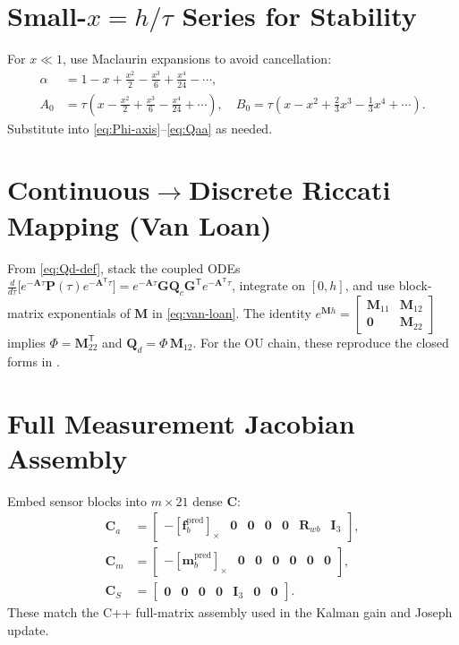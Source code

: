 \documentclass[11pt]{article}
\newcommand{\vect}[1]{\bm{#1}}
\newcommand{\mat}[1]{\bm{#1}}
\newcommand{\T}{\mathsf{T}}
\newcommand{\I}{\mat{I}}
\newcommand{\skx}[1]{\left[ #1 \right]_\times}
\begin{document}
\section{Small-\texorpdfstring{$x=h/\tau$}{x} Series for Stability}
\label{app:series-guards}
For \(x\ll 1\), use Maclaurin expansions to avoid cancellation:
\begin{align}
  \alpha &= 1 - x + \tfrac{x^2}{2} - \tfrac{x^3}{6} + \tfrac{x^4}{24} - \cdots, \\
  A_0 &= \tau\!\left(x - \tfrac{x^2}{2} + \tfrac{x^3}{6} - \tfrac{x^4}{24} + \cdots\right),\quad
  B_0 = \tau\!\left(x - x^2 + \tfrac{2}{3}x^3 - \tfrac{1}{3}x^4 + \cdots\right).
  \label{eq:series}
\end{align}
Substitute into \eqref{eq:Phi-axis}--\eqref{eq:Qaa} as needed.

\section{Continuous\texorpdfstring{$\to$}{}Discrete Riccati Mapping (Van Loan)}
\label{app:van-loan-derivation}
From \eqref{eq:Qd-def}, stack the coupled ODEs
\(
\frac{d}{d\tau}\bigl[e^{-\mat{A}\tau}\mat{P}(\tau)e^{-\mat{A}^{\T}\tau}\bigr]
= e^{-\mat{A}\tau}\mat{G}\mat{Q}_c\mat{G}^{\T} e^{-\mat{A}^{\T}\tau}
\),
integrate on \([0,h]\), and use block-matrix exponentials of \(\mat{M}\) in \eqref{eq:van-loan}.
The identity \(e^{\mat{M}h}=\begin{bmatrix}\mat{M}_{11}&\mat{M}_{12}\\\mat{0}&\mat{M}_{22}\end{bmatrix}\)
implies \(\Phi=\mat{M}_{22}^{\T}\) and \(\mat{Q}_d=\Phi\,\mat{M}_{12}\).
For the OU chain, these reproduce the closed forms in .

\section{Full Measurement Jacobian Assembly}
\label{app:full-C}
Embed sensor blocks into \(m\times 21\) dense \(\mat{C}\):
\begin{align}
  \mat{C}_a &= \begin{bmatrix}
     -\skx{\vect{f}_b^{\mathrm{pred}}} & \mat{0} & \mat{0} & \mat{0} & \mat{0} & \mat{R}_{wb} & \I_3
  \end{bmatrix}, \label{eq:C-acc-full}\\
  \mat{C}_m &= \begin{bmatrix}
     -\skx{\vect{m}_b^{\mathrm{pred}}} & \mat{0} & \mat{0} & \mat{0} & \mat{0} & \mat{0} & \mat{0}
  \end{bmatrix}, \label{eq:C-mag-full}\\
  \mat{C}_S &= \begin{bmatrix}
     \mat{0} & \mat{0} & \mat{0} & \mat{0} & \I_3 & \mat{0} & \mat{0}
  \end{bmatrix}. \label{eq:C-S-full}
\end{align}
These match the C++ full-matrix assembly used in the Kalman gain and Joseph update.
\end{document}
